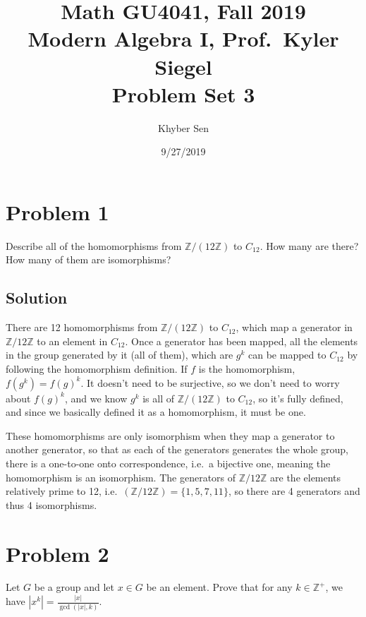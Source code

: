 \documentclass[fleqn]{article}
\title{
Math GU4041, Fall 2019 \\
Modern Algebra I, Prof.\ Kyler Siegel \\
Problem Set 3
}
\author{Khyber Sen}
\date{9/27/2019}
\begin{document}
    
    \maketitle
    
    \section{Problem 1}
    Describe all of the homomorphisms from $\mathbb{Z}/(12\mathbb{Z})$ to $C_{12}$.  How many are there?  How many of them are isomorphisms?
        
        \subsection{Solution}
        There are 12 homomorphisms from $\mathbb{Z}/(12\mathbb{Z})$ to $C_{12}$, which map a generator in $\mathbb{Z}/12\mathbb{Z}$ to an element in $C_{12}$.  Once a generator has been mapped, all the elements in the group generated by it (all of them), which are $g^k$ can be mapped to $C_{12}$ by following the homomorphism definition.  If $f$ is the homomorphism, $f(g^k) = f(g)^k$.  It doesn't need to be surjective, so we don't need to worry about $f(g)^k$, and we know $g^k$ is all of $\mathbb{Z}/(12\mathbb{Z})$ to $C_{12}$, so it's fully defined, and since we basically defined it as a homomorphism, it must be one.
        
        These homomorphisms are only isomorphism when they map a generator to another generator, so that as each of the generators generates the whole group, there is a one-to-one onto correspondence, i.e.\ a bijective one, meaning the homomorphism is an isomorphism.  The generators of $\mathbb{Z}/12\mathbb{Z}$ are the elements relatively prime to 12, i.e.\ $(\mathbb{Z}/12\mathbb{Z}) = \{1, 5, 7, 11\}$, so there are 4 generators and thus 4 isomorphisms.
    
    \section{Problem 2}
    Let $G$ be a group and let $x \in G$ be an element.  Prove that for any $k \in \mathbb{Z}^+$, we have $\left|x^k\right| = \frac{|x|}{\gcd(|x|, k)}$.
        
\end{document}
